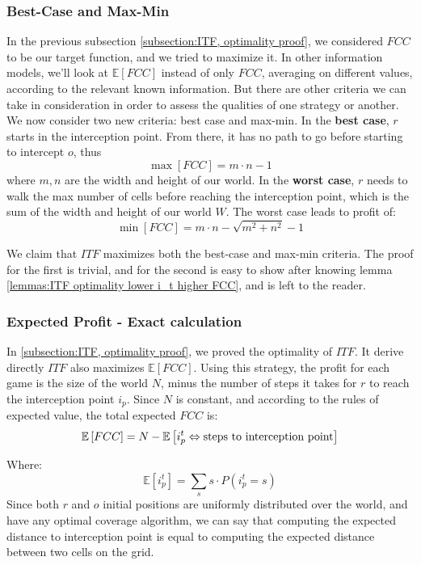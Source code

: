 \documentclass[a4paper,10pt]{article}
\newcommand\rob{\ensuremath{r}\xspace}
\newcommand\opp{\ensuremath{o}\xspace}
\newcommand{\w}{\ensuremath{W}\xspace}
\newcommand{\fcc}{\ensuremath{FCC}\xspace}
\newcommand{\itf}{\ensuremath{ITF}\xspace}
\begin{document}
\subsubsection{Best-Case and Max-Min}
In the previous subsection \ref{subsection:ITF, optimality proof}, we considered \fcc to be our target function, and we tried to maximize it. In other information models, we'll look at $\mathbb{E}[\fcc]$ instead of only \fcc, averaging on different values, according to the relevant known information.
But there are other criteria we can take in consideration in order to assess the qualities of one strategy or another.
We now consider two new criteria: best case and max-min.
In the \textbf{best case}, \rob starts in the interception point. From there, it has no path to go before starting to intercept \opp, thus \[\max[\fcc] = m\cdot n-1\] where $m,n$ are the width and height of our world.
In the \textbf{worst case}, \rob needs to walk the max number of cells before reaching the interception point, which is the sum of the width and height of our world \w. The worst case leads to profit of: \[\min[\fcc] = m\cdot n - \sqrt{m^2 + n^2} - 1\]

We claim that \itf maximizes both the best-case and max-min criteria. The proof for the first is trivial, and for the second is easy to show after knowing lemma \ref{lemmas:ITF optimality lower i_t higher FCC}, and is left to the reader.


\subsubsection{Expected Profit - Exact calculation}
In \ref{subsection:ITF, optimality proof}, we proved the optimality of \itf. It derive directly \itf also maximizes $\mathbb{E}[\fcc]$. Using this strategy, the profit for each game is the size of the world $N$, minus the number of steps it takes for \rob to reach the interception point $i_p$.
Since $N$ is constant, and according to the rules of expected value, the total expected \fcc is: \[\mathbb{E}\left[\fcc\right]=N-\mathbb{E}\left[i_p^t \Leftrightarrow\textnormal{steps to interception point}\right]\]

Where: \[\mathbb{E}\left[i_p^t\right]=\sum_{s}{s\cdot P\left(i_p^t=s\right)}\]
Since both \rob and \opp initial positions are uniformly distributed over the world, and have any optimal coverage algorithm, we can say that computing the expected distance to interception point is equal to computing the expected distance between two cells on the grid.
\end{document}
